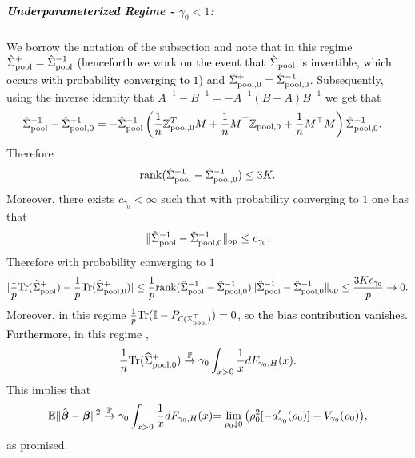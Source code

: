 \documentclass{article}
\theoremstyle{plain}
\theoremstyle{remark}
\def \bbeta{\boldsymbol{\beta}}
\def \bbeta{\boldsymbol{\beta}}
\def \Xm {\mathbb{X}_{\rm pool}}
\def \tr {\mathrm{Tr}}
\def \I{\mathcal{I}}
\def \E{\mathbb{E}}
\def \P{\mathbb{P}}
\def \I {\mathbb{I}}
\begin{document}
\subparagraph{\textcolor{black}{Underparameterized} Regime - $\gamma_0<1$:} We borrow the notation of the subsection and note that in this regime $\hat{\Sigma}_{\rm pool}^+=\hat{\Sigma}_{\rm pool}^{-1}$ \textcolor{black}{(henceforth we work on the event that $\hat{\Sigma}_{\rm pool}$ is invertible, which occurs with probability converging to $1$)} and $\hat{\Sigma}_{\rm pool,0}^+=\hat{\Sigma}_{\rm pool,0}^{-1}$. Subsequently, using the inverse identity that $A^{-1}-B^{-1}=-A^{-1}(B-A)B^{-1}$ we get that
\begin{align*}
    \hat{\Sigma}_{\rm pool}^{-1}-\hat{\Sigma}_{\rm pool,0}^{-1}&=- \hat{\Sigma}_{\rm pool}^{-1}\left(\frac{1}{n}\mathbb{Z}_{\rm pool,0}^T M+\frac{1}{n}M^\top\mathbb{Z}_{\rm pool,0}+\frac{1}{n}M^\top M\right)\hat{\Sigma}_{\rm pool,0}^{-1}.
\end{align*}
Therefore
\begin{align*}
    \mathrm{rank}(\hat{\Sigma}_{\rm pool}^{-1}-\hat{\Sigma}_{\rm pool,0}^{-1})\leq 3K.
\end{align*}
Moreover, there exists $c_{\gamma_0}<\infty$ such that with probability converging to $1$ \citep{bai2010spectral} one has that
\begin{align*}
    \|\hat{\Sigma}_{\rm pool}^{-1}-\hat{\Sigma}_{\rm pool,0}^{-1}\|_{\rm op}\leq c_{\gamma_0}.
\end{align*}
Therefore with probability converging to $1$ 
\begin{align*}
    |\frac{1}{p}\tr(\widehat{\Sigma}_{\rm pool}^+)-\frac{1}{p}\tr(\widehat{\Sigma}_{\rm pool,0}^+)|\leq \frac{1}{p}\mathrm{rank}(\hat{\Sigma}_{\rm pool}^{-1}-\hat{\Sigma}_{\rm pool,0}^{-1})\|\hat{\Sigma}_{\rm pool}^{-1}-\hat{\Sigma}_{\rm pool,0}^{-1}\|_{\rm op}\leq \frac{3Kc_{\gamma_0}}{p}\to 0.
\end{align*}
Moreover, in this regime $\frac{1}{p}\tr(\I-P_{\mathcal{C}(\textcolor{black}{\Xm^\top})})=0$, \textcolor{black}{so the bias contribution vanishes. Furthermore,} in this regime \citep{hastie2019surprises},
\begin{align*}
    \frac{1}{n}\tr(\widehat{\Sigma}_{\rm pool,0}^+)\stackrel{\P}{\to} \gamma_0\int_{x>0}\frac{1}{x}dF_{\gamma_0,H}(x).
\end{align*}
This implies that
\begin{align*}
    \E\|\hat{\bbeta}-\bbeta\|^2 \stackrel{\P}{\to} \gamma_0\int_{x>0}\frac{1}{x}dF_{\gamma_0,H}(x)\textcolor{black}{=\lim_{\rho_0\downarrow 0}\left(\rho_0^2[-a_{\gamma_0}'(\rho_0)]
    +
    V_{\gamma_0}(\rho_0)\right)},
\end{align*}
as promised.
\end{document}
